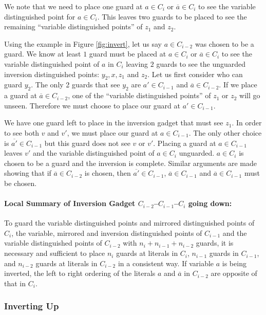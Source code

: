 \documentclass[11pt]{article}
\begin{document}
We note that we need to place one guard at $a \in C_i$ or $\overline{a} \in C_i$ to see the variable distinguished point for $a \in C_i$.  This leaves two guards to be placed to see the remaining ``variable distinguished points'' of $z_1$ and $z_2$.

Using the example in Figure \ref{fig:invert}, let us say $a \in C_{i-2}$ was chosen to be a guard.  We know at least $1$ guard must be placed at $a \in C_i$ or $\overline{a} \in C_i$ to see the variable distinguished point of $a$ in $C_i$ leaving $2$ guards to see the unguarded inversion distinguished points: $y_2, x, z_1$ and $z_2$.  Let us first consider who can guard $y_2$.  The only 2 guards that see $y_2$ are $a' \in C_{i-1}$ and $\overline{a} \in C_{i-2}$.  If we place a guard at $\overline{a} \in C_{i-2}$, one of the ``variable distinguished points'' of $z_1$ or $z_2$ will go unseen.  Therefore we must choose to place our guard at $a' \in C_{i-1}$.

We have one guard left to place in the inversion gadget that must see $z_1$.  In order to see both $v$ and $v'$, we must place our guard at $a \in C_{i-1}$.  The only other choice is $\overline{a'} \in C_{i-1}$ but this guard does not see $v$ or $v'$.  Placing a guard at $a \in C_{i-1}$ leaves $v'$ and the variable distinguished point of $a \in C_i$ unguarded.  $a \in C_i$ is chosen to be a guard and the inversion is complete.  Similar arguments are made showing that if $\overline{a} \in C_{i-2}$ is chosen, then $\overline{a'} \in C_{i-1}$, $\overline{a} \in C_{i-1}$ and $\overline{a} \in C_{i-1}$ must be chosen.

\paragraph{Local Summary of Inversion Gadget $C_{i-2}$--$C_{i-1}$--$C_i$ going down:}  To guard the variable distinguished points and mirrored distinguished points of $C_i$, the variable, mirrored and inversion distinguished points of $C_{i-1}$ and the variable distinguished points of $C_{i-2}$ with $n_i + n_{i-1} + n_{i-2}$ guards, it is necessary and sufficient to place $n_i$ guards at literals in $C_i$, $n_{i-1}$ guards in $C_{i-1}$, and $n_{i-2}$ guards at literals in $C_{i-2}$ in a consistent way.  If variable $a$ is being inverted, the left to right ordering of the literals $a$ and $\overline{a}$ in $C_{i-2}$ are opposite of that in $C_i$.

\subsubsection{Inverting Up}
\end{document}
